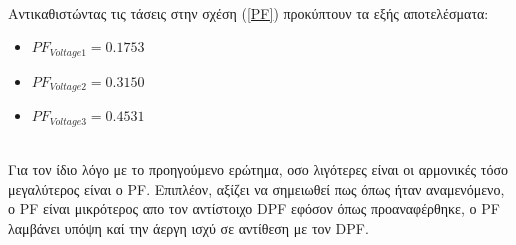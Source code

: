 \noindent\\
Αντικαθιστώντας τις τάσεις στην σχέση (\ref{PF}) προκύπτουν τα εξής αποτελέσματα:
\begin{itemize}
    \item $PF_{Voltage1} = 0.1753$
    \item $PF_{Voltage2} = 0.3150$
    \item $PF_{Voltage3} = 0.4531$
\end{itemize}

\noindent\\
Για τον ίδιο λόγο με το προηγούμενο ερώτημα, οσο λιγότερες είναι οι αρμονικές τόσο μεγαλύτερος είναι ο PF. Επιπλέον, αξίζει να σημειωθεί πως όπως ήταν αναμενόμενο,  ο PF είναι μικρότερος απο τον αντίστοιχο DPF εφόσον όπως προαναφέρθηκε, ο PF λαμβάνει υπόψη καί την άεργη ισχύ σε αντίθεση με τον DPF.